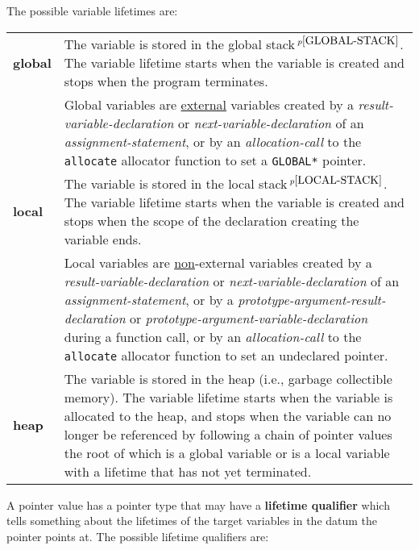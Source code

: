 \documentclass[12pt]{article}
\newcommand{\key}[1]{{\rm \bfseries #1}}
\newcommand{\pagnote}[1]{$\,^{p\pageref{#1}}$}
\newenvironment{indpar}[1][0.3in]%
	{\begin{list}{}%
		     {\setlength{\itemsep}{0in}%
		      \setlength{\topsep}{0in}%
		      \setlength{\parsep}{1ex}%
		      \setlength{\labelwidth}{#1}%
		      \setlength{\leftmargin}{#1}%
		      \addtolength{\leftmargin}{\labelsep}}%
	 \item}%
	{\end{list}}
\begin{document}
The possible variable lifetimes are:
\begin{indpar}[0.2in]
\begin{tabular}{lp{5.0in}}
\key{global} &
	The variable is stored in the global stack\pagnote{GLOBAL-STACK}.
	The variable lifetime starts when the variable is created
	and stops when the program terminates.
	\\[1ex]
	&
	Global variables are \underline{external} variables created by
	a {\em result-variable-declaration} or {\em next-variable-declaration}
	of an {\em assignment-state\-ment}, or by an {\em allocation-call}
	to the {\tt allocate} allocator function to set a {\tt *GLOBAL*}
	pointer.

\\[1ex]
\key{local} &
	The variable is stored in the local stack\pagnote{LOCAL-STACK}.
	The variable lifetime starts when the variable is created
	and stops when the scope of the declaration creating the
	variable ends.
	\\[1ex]
	&
	Local variables are \underline{non}-external variables created by
	a {\em result-variable-declaration} or
	{\em next-variable-declaration}
	of an {\em assignment-state\-ment},
	or by a {\em prototype-argument-result-declaration} or
	{\em prototype-argument-variable-declaration} during a
	function call,
	or by an {\em allocation-call}
	to the {\tt allocate} allocator function to set an undeclared pointer.
\\[1ex]
\key{heap} &
	The variable is stored in the heap (i.e., garbage collectible memory).
	The variable lifetime starts when the variable is allocated
	to the heap, and stops when the variable can no longer
        be referenced by following a chain of pointer values
        the root of which is a global variable or is a local variable
        with a lifetime that has not yet terminated.
\end{tabular}
\end{indpar}

A pointer value has a pointer type that may have a \key{lifetime qualifier}
which tells something about the lifetimes of the target variables in the
datum the pointer points at.  The possible lifetime qualifiers are:
\end{document}
